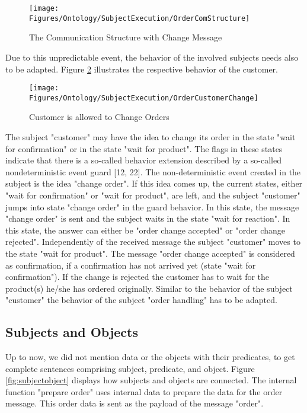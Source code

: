 \begin{figure}[htbp]
	\centering
	\texttt{[image: Figures/Ontology/SubjectExecution/OrderComStructure]}
	\caption[The Communication Structure with Change Message]{The Communication Structure with Change Message}
	\label{fig:ordercomstructure}
\end{figure}

Due to this unpredictable event, the behavior of the involved subjects needs also to be adapted. Figure \ref{fig:ordercustomerchange} illustrates the respective behavior of the customer. 

\begin{figure}[htbp]
	\centering
	\texttt{[image: Figures/Ontology/SubjectExecution/OrderCustomerChange]}
	\caption[Customer is allowed to Change Orders]{Customer is allowed to Change Orders}
	\label{fig:ordercustomerchange}
\end{figure}

The subject "customer" may have the idea to change its order in the state "wait for confirmation" or in the state "wait for product". The flags in these states indicate that there is a so-called behavior extension described by a so-called nondeterministic event guard [12, 22]. The non-deterministic event created in the subject is the idea "change order". If this idea comes up, the current states, either "wait for confirmation" or "wait for product", are left, and the subject "customer" jumps into state "change order" in the guard behavior. In this state, the message "change order" is sent and the subject waits in the state "wait for reaction". In this state, the answer can either be "order change accepted" or "order change rejected". Independently of the received message the subject "customer" moves to the state "wait for product". The message "order change accepted" is considered as confirmation, if a confirmation has not arrived yet (state "wait for confirmation"). If the change is rejected the customer has to wait for the product(s) he/she has ordered originally. Similar to the behavior of the subject "customer" the behavior of the subject "order handling" has to be adapted.

\subsection{Subjects and Objects}
\label{SUbjects-Objects}

Up to now, we did not mention data or the objects with their predicates, to get complete sentences comprising subject, predicate, and object. Figure \ref{fig:subjectobject} displays how subjects and objects are connected. The internal function "prepare order" uses internal data to prepare the data for the order message. This order data is sent as the payload of the message "order".

